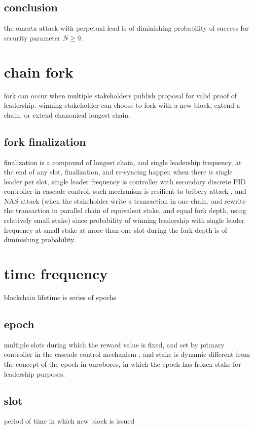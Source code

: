 \documentclass{article}
\begin{document}
\subsection {conclusion}
the omerta attack with perpetual lead is of diminishing probability of success for security parameter $N \ge 9$.

\section{chain fork}
fork can occur when multiple stakeholders publish proposal for valid proof of leadership.
winning stakeholder can choose to fork with a new block, extend a chain, or extend chanonical longest chain.

\subsection{fork finalization}
finalization is a compound of longest chain, and single leadership frequency, at the end of any slot, finalization, and re-syncing happen when there is single leader per slot, single leader frequency is controller with secondary discrete PID controller in cascade control.
such mechanism is resilient to bribery attack \cite{attack_bribery}, and NAS attack (when the stakeholder write a transaction in one chain, and rewrite the transaction in parallel chain of equivalent stake, and equal fork depth, using relatively small stake) since probability of winning leadership with single leader frequency at small stake at more than one slot during the fork depth  is of diminishing probability.


\section {time frequency}
blockchain lifetime is series of epochs

\subsection {epoch}
multiple slots during which the reward value is fixed, and set by primary controller in the cascade control mechanism \cite{cascade}, and stake is dynamic different from the concept of the epoch in ouroboros, in which the epoch has frozen stake for leadership purposes.

\subsection {slot}
period of time in which new block is issued
\end{document}
